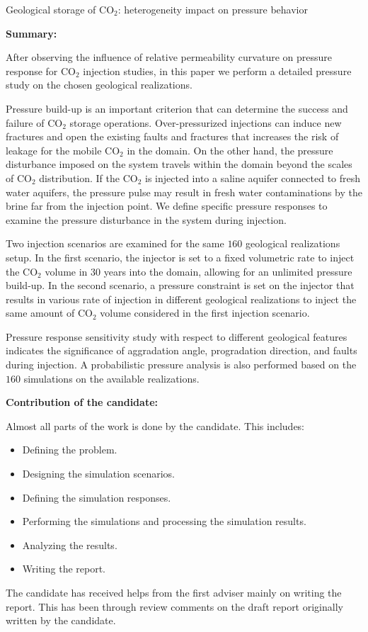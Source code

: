 %
%
{Geological storage of CO$_2$: heterogeneity impact on pressure behavior}
{\textbf{Summary:}

After observing the influence of relative permeability curvature on pressure
response for $\mbox{CO}_2$ injection studies, in this paper we perform a
detailed pressure study on the chosen geological realizations.

Pressure build-up is an important criterion that can determine the success and failure of
$\mbox{CO}_2$ storage operations. Over-pressurized injections can induce
new fractures and open the existing faults and fractures that increases the risk
of leakage for the mobile $\mbox{CO}_2$ in the domain. On the other
hand, the pressure disturbance imposed on the system travels within the
domain beyond the scales of $\mbox{CO}_2$ distribution. If the CO$_2$ is
injected into a saline aquifer connected to fresh water aquifers, the pressure
pulse may result in fresh water contaminations by the brine far from the
injection point. We define specific pressure responses to examine the pressure
disturbance in the system during injection.

Two injection scenarios are examined for the same $160$ geological realizations
setup. In the first scenario, the injector is set to a fixed volumetric rate to
inject the $\mbox{CO}_2$ volume in $30$ years into the domain, allowing for an
unlimited pressure build-up. In the second scenario, a pressure constraint is
set on the injector that results in various rate of injection in different
geological realizations to inject the same amount of $\mbox{CO}_2$ volume
considered in the first injection scenario. 

Pressure response sensitivity study with respect to different geological
features indicates the significance of aggradation angle, progradation
direction, and faults during injection. A probabilistic pressure analysis is
also performed based on the $160$ simulations on the available realizations.

\vspace{0.5cm}
\noindent\textbf{Contribution of the candidate:}

Almost all parts of the work is done by the candidate. This includes:
\begin{itemize}
\item Defining the problem.
\item Designing the simulation scenarios.
\item Defining the simulation responses.
\item Performing the simulations  and processing the simulation results.
\item Analyzing the results.
\item Writing the report.
\end{itemize}

The candidate has received helps from the first adviser mainly on writing the report. This has been through review comments on the draft report originally written by the candidate. 

}


